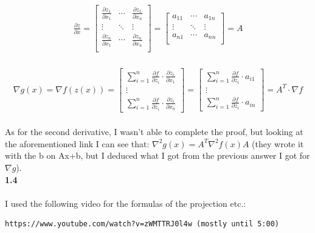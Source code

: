 \documentclass[fleqn]{article}
\begin{document}
\begin{align*}
\frac{\partial z}{\partial x} = 
\begin{bmatrix}
\frac{\partial z_1}{\partial x_1} & \cdots & \frac{\partial z_1}{\partial x_n} \\
\vdots 							  & \ddots & \vdots                            \\
\frac{\partial z_n}{\partial x_1} & \cdots & \frac{\partial z_n}{\partial x_n} \\
\end{bmatrix}
=
\begin{bmatrix}
a_{11} & \cdots & a_{1n} \\
\vdots & \ddots & \vdots \\
a_{n1} & \cdots & a_{nn} \\
\end{bmatrix}
=A
\end{align*} \\

\begin{align*}
\nabla g(x) = \nabla f(z(x)) =
\begin{bmatrix}
\sum_{i=1}^n  \frac{\partial f}{\partial z_i} \cdot \frac{\partial z_i}{\partial x_1}
\\
\vdots
\\
\sum_{i=1}^n  \frac{\partial f}{\partial z_i} \cdot \frac{\partial z_i}{\partial x_n}
\end{bmatrix}
=
\begin{bmatrix}
\sum_{i=1}^n  \frac{\partial f}{\partial z_i} \cdot a_{i1}
\\
\vdots
\\
\sum_{i=1}^n  \frac{\partial f}{\partial z_i} \cdot a_{in}
\end{bmatrix}
=
A^T \cdot \nabla f
\end{align*} \\


As for the second derivative, I wasn't able to complete the proof, but looking at the aforementioned link I can see that: $\nabla ^2 g(x) = A^T \nabla ^2f(x) A $ (they wrote it with the b on Ax+b, but I deduced what I got from the previous answer I got for $\nabla g$). \\ 


\textbf{1.4} \\ \\
I used the following video for the formulas of the projection etc.:
\begin{verbatim}
https://www.youtube.com/watch?v=zWMTTRJ0l4w (mostly until 5:00)
\end{verbatim}
\end{document}
